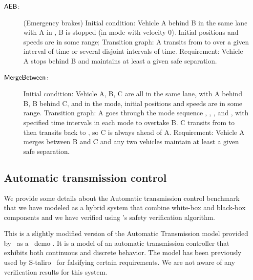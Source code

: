 \begin{description}
	\item[${\operatorname{\mathsf{AEB}}}$:]
	(Emergency brakes) 
	Initial condition: Vehicle A behind  B in the same lane with A in , B is stopped (in  mode with velocity $0$). Initial positions and speeds are in some range;
	Transition graph: A transits from  to   over a given interval of time or several disjoint intervals of time.
	Requirement: Vehicle A stops behind B and maintains at least a given safe separation.
	
	\item[${\operatorname{\mathsf{MergeBetween}}}$:]
	Initial condition: Vehicle A, B, C are all in the same lane, with A behind B, B behind C, and in the  mode, initial positions and speeds are in some range.
	Transition graph: A goes through the mode sequence , , , and  ,  with specified time intervals in each mode to overtake B. C transits from  to  then transits back to , so C is always ahead of A.
	Requirement: Vehicle A merges between B and C and any two vehicles maintain at least a given safe separation.
\end{description}



\subsection{Automatic transmission control}
\label{ssec:gear}
We provide some details about the Automatic transmission control benchmark that we have modeled as a hybrid system that combine white-box and black-box components and we have verified using \toolname's safety verification algorithm.

This is a slightly modified version of the Automatic Transmission model provided by \Mathworks\ as a \Simulink\ demo \cite{Matlab_trans}. 
It is a model of an automatic transmission controller that exhibits both continuous and discrete behavior.
The model has  been previously  used by  S-taliro~\cite{S-Taliro} for falsifying certain requirements. We are not aware of any verification results for this system.

